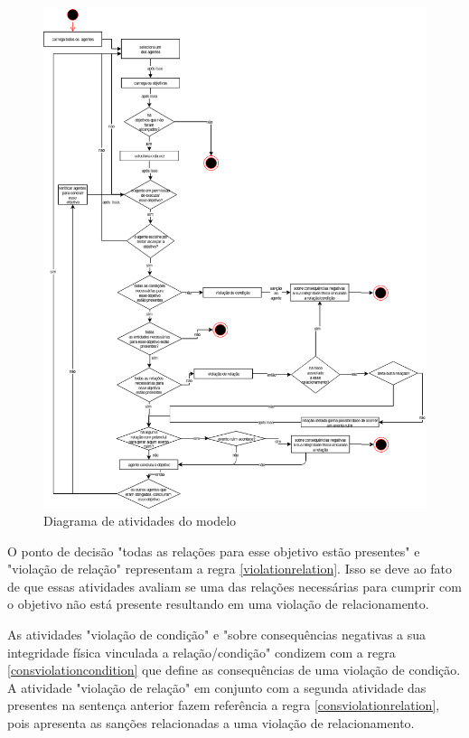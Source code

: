 \begin{figure}[H]
  \centering
  \includegraphics[width=1\linewidth]{figure/DiagramaDeAtividade.png} 
  \caption{Diagrama de atividades do modelo}
  \label{atividiagram}
\end{figure}

O ponto de decisão "todas as relações para esse objetivo estão presentes" e "violação de relação" representam a regra \ref{violationrelation}. Isso se deve ao fato de que essas atividades avaliam se uma das relações necessárias para cumprir com o objetivo não está presente resultando em uma violação de relacionamento. 

As atividades  "violação de condição" e "sobre consequências negativas a sua integridade física vinculada a relação/condição" condizem com a regra \ref{consviolationcondition} que define as consequências de uma violação de condição. A atividade "violação de relação" em conjunto com a segunda atividade das presentes na sentença anterior fazem referência a regra \ref{consviolationrelation}, pois apresenta as sanções relacionadas a uma violação de relacionamento. 

